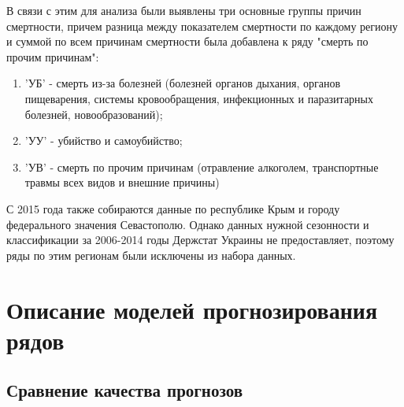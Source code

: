\documentclass[12pt,a4paper, oneside]{extreport}
\begin{document}
В связи с этим для анализа были выявлены три основные группы причин смертности, причем разница между показателем смертности по каждому региону и суммой по всем причинам смертности была добавлена к ряду "смерть по прочим причинам":  



\begin{enumerate}
	\item  'УБ' - смерть из-за болезней (болезней органов дыхания, органов пищеварения, системы кровообращения, инфекционных и паразитарных болезней, новообразований);
\item 'УУ'  -  убийство и самоубийство;
\item 'УВ'  -  смерть по прочим причинам (отравление алкоголем, транспортные травмы всех видов и внешние причины)
\end{enumerate}


С 2015 года также собираются данные по республике Крым и городу федерального значения Севастополю. Однако данных нужной сезонности и классификации за 2006-2014 годы Держстат Украины не предоставляет, поэтому ряды по этим регионам были исключены из набора данных. 




\section{Описание моделей прогнозирования рядов }

\subsection*{Сравнение качества прогнозов}
\end{document}
